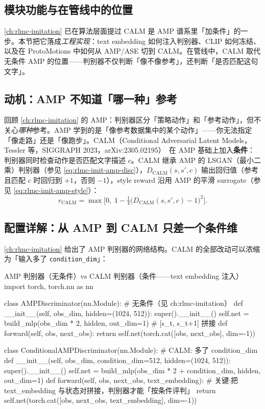 \subsection{模块功能与在管线中的位置}
\label{sec:rlmc-mm-calm-pos}

\cref{ch:rlmc-imitation} 已在算法层面提过 CALM 是 AMP 谱系里「加条件」的一步。本节把它落成\emph{工程实现}：text embedding 如何注入判别器、CLIP 如何冻结、以及在 ProtoMotions 中如何从 AMP/ASE 切到 CALM。在管线中，CALM 取代无条件 AMP 的位置——判别器不仅判断「像不像参考」，还判断「是否匹配这句文字」。

\subsection{动机：AMP 不知道「哪一种」参考}
\label{sec:rlmc-mm-calm-motivation}

回顾 \cref{ch:rlmc-imitation} 的 AMP：判别器区分「策略动作」和「参考动作」，但不关心\emph{哪种}参考。AMP 学到的是「像参考数据集中的某个动作」——你无法指定「像走路」还是「像跑步」。CALM（Conditional Adversarial Latent Models，Tessler 等，SIGGRAPH 2023，arXiv:2305.02195）\,\cite{tessler2023calm} 在 AMP 基础上加入\textbf{条件}：判别器同时检查动作是否匹配文字描述 $c$。CALM 继承 AMP 的 LSGAN（最小二乘）判别器（参见 \cref{eq:rlmc-imit-amp-disc}），$D_{\mathrm{CALM}}(s,s',c)$ 输出回归值（参考且匹配 $c$ 时回归到 $+1$，否则 $-1$），style reward 沿用 AMP 的平滑 surrogate（参见 \cref{eq:rlmc-imit-amp-style}）：
\begin{equation}
r_{\mathrm{CALM}} = \max\!\Big[0,\; 1 - \tfrac14\big(D_{\mathrm{CALM}}(s, s', c) - 1\big)^2\Big].
\label{eq:rlmc-mm-calm-reward}
\end{equation}

\subsection{配置详解：从 AMP 到 CALM 只差一个条件维}
\label{sec:rlmc-mm-calm-config}

\cref{ch:rlmc-imitation} 给出了 AMP 判别器的网络结构。CALM 的全部改动可以浓缩为「输入多了 \verb|condition_dim|」：

\begin{codebox}[Python]{AMP 判别器（无条件）vs CALM 判别器（条件——text embedding 注入）}
import torch, torch.nn as nn

class AMPDiscriminator(nn.Module):           # 无条件（见 ch:rlmc-imitation）
    def __init__(self, obs_dim, hidden=(1024, 512)):
        super().__init__()
        self.net = build_mlp(obs_dim * 2, hidden, out_dim=1)   # [s_t, s_{t+1}] 拼接
    def forward(self, obs, next_obs):
        return self.net(torch.cat([obs, next_obs], dim=-1))

class ConditionalAMPDiscriminator(nn.Module):  # CALM: 多了 condition_dim
    def __init__(self, obs_dim, condition_dim=512, hidden=(1024, 512)):
        super().__init__()
        self.net = build_mlp(obs_dim * 2 + condition_dim, hidden, out_dim=1)
    def forward(self, obs, next_obs, text_embedding):
        # 关键:把 text_embedding 与状态对拼接，判别器才能「按条件评判」
        return self.net(torch.cat([obs, next_obs, text_embedding], dim=-1))
\end{codebox}


